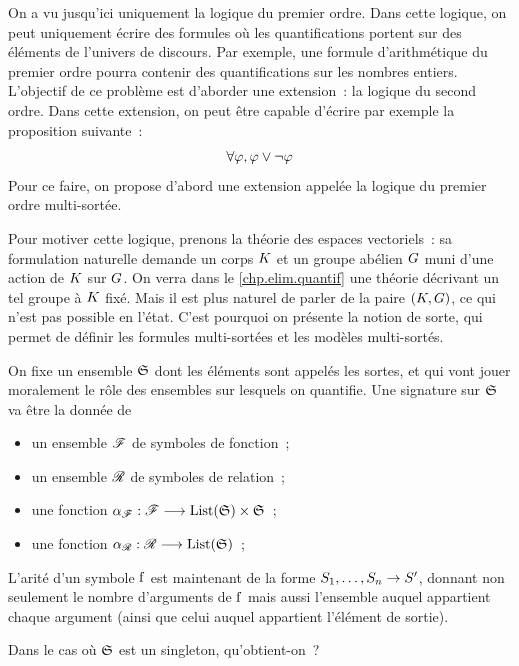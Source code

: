 \begin{problem}
  On a vu jusqu'ici uniquement la logique du premier ordre. Dans cette logique,
  on peut uniquement écrire des formules où les quantifications portent sur des
  éléments de l'univers de discours. Par exemple, une formule d'arithmétique du
  premier ordre pourra contenir des quantifications sur les nombres entiers.
  L'objectif de ce problème est d'aborder une extension~: la logique du second
  ordre. Dans cette extension, on peut être capable d'écrire par exemple la
  proposition suivante~:
  \[\forall \varphi, \varphi\lor\lnot\varphi\]
  Pour ce faire, on propose d'abord une extension appelée la logique du premier
  ordre multi-sortée.


  Pour motiver cette logique, prenons la théorie des espaces vectoriels~: sa
  formulation naturelle demande un corps $K$ et un groupe abélien $G$
  muni d'une action de $K$ sur $G$. On verra dans le
  \cref{chp.elim.quantif} une théorie décrivant un tel groupe à $K$
  fixé. Mais il est plus naturel de parler de la paire $(K,G)$, ce
  qui n'est pas possible en l'état. C'est pourquoi on présente la notion de
  sorte, qui permet de définir les formules multi-sortées et les modèles
  multi-sortés.

  On fixe un ensemble $\mathfrak{S}$ dont les éléments sont appelés les sortes, et
  qui vont jouer moralement le rôle des ensembles sur lesquels on quantifie.
  Une signature sur $\mathfrak{S}$ va être la donnée de
  \begin{itemize}
  \item un ensemble $\mathscr F$ de symboles de fonction~;
  \item un ensemble $\mathscr R$ de symboles de relation~;
  \item une fonction
    $\alpha_{\mathscr F} : \displaystyle \mathscr F \longrightarrow \operatorname{List}(\mathfrak{S})\times\mathfrak{S}$~;
  \item une fonction $\alpha_{\mathscr R} : \displaystyle \mathscr R \longrightarrow \operatorname{List}(\mathfrak{S})$~;
  \end{itemize}
  L'arité d'un symbole $\mathrm{f}$ est maintenant de la forme
  $S_1,\ldots,S_n \to S'$, donnant non seulement le nombre
  d'arguments de $\mathrm{f}$ mais aussi l'ensemble auquel appartient chaque
  argument (ainsi que celui auquel appartient l'élément de sortie).
  \begin{pbQuest}
  \item Dans le cas où $\mathfrak{S}$ est un singleton, qu'obtient-on~?
  \end{pbQuest}


\end{problem}
